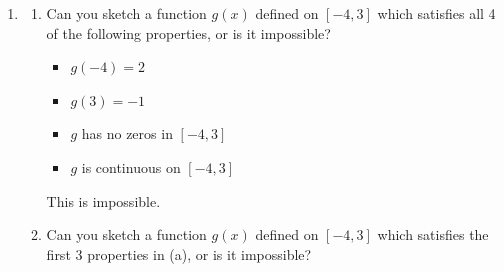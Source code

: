 \documentclass[main]{subfiles}
\begin{document}
\begin{enumerate}[resume]
\begin{enumerate}
    \begin{solution}
      False; for example, in \ref{continuous-differentiable-1}, $f(x)$ is continuous at $x = -3$, but it is not differentiable at $x = -3$. Any place where $f(x)$ has a ``corner'' is a counterexample.
    \end{solution}

  \item


    \begin{problem}[1in]
      If $f(x)$ is differentiable at $x = a$, then $f(x)$ is continuous
      at $x = a$.
    \end{problem}

    \begin{solution}
      This is true.
    \end{solution}

  \end{enumerate}

\item 
  \begin{enumerate}
  \item


    \begin{problem}[\vfill]
      Can you sketch a function $g(x)$ defined on $[-4, 3]$ which satisfies all 4 of the following properties, or is it impossible?
      \begin{itemize}[nosep]
      \item $g(-4) = 2$
      \item $g(3) = -1$
      \item $g$ has no zeros in $[-4, 3]$
      \item $g$ is continuous on $[-4, 3]$
      \end{itemize}
    \end{problem}

    \begin{solution}
      This is impossible. 
    \end{solution}

  \item
    \begin{problem}[\vfill\newpage]
      Can you sketch a function $g(x)$ defined on $[-4, 3]$ which satisfies the first 3 properties in (a), or is it impossible?
    \end{problem}


\end{enumerate}
\end{enumerate}
\end{document}
